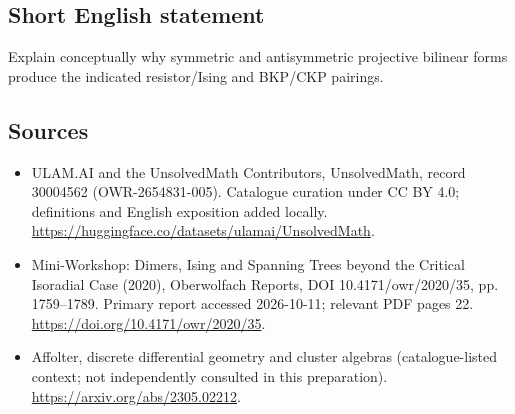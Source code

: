 \documentclass[11pt]{article}
\begin{document}
\subsection{Short English statement}
Explain conceptually why symmetric and antisymmetric projective bilinear forms produce the indicated resistor/Ising and BKP/CKP pairings.
\subsection{Sources}
\begin{itemize}
\item[\hypertarget{source:30004562:1}{S1}] ULAM.AI and the UnsolvedMath Contributors, UnsolvedMath, record 30004562 (OWR-2654831-005). Catalogue curation under CC BY 4.0; definitions and English exposition added locally.
\url{https://huggingface.co/datasets/ulamai/UnsolvedMath}.
\item[\hypertarget{source:30004562:2}{S2}] Mini-Workshop: Dimers, Ising and Spanning Trees beyond the Critical Isoradial Case (2020), Oberwolfach Reports, DOI 10.4171/owr/2020/35, pp. 1759--1789. Primary report accessed 2026-10-11; relevant PDF pages 22.
\url{https://doi.org/10.4171/owr/2020/35}.
\item[\hypertarget{source:30004562:3}{S3}] Affolter, discrete differential geometry and cluster algebras (catalogue-listed context; not independently consulted in this preparation).
\url{https://arxiv.org/abs/2305.02212}.
\end{itemize}
\label{end:30004562}
\end{document}
